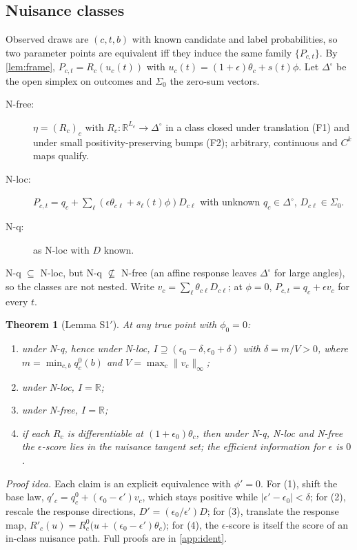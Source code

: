 \documentclass[10pt,twocolumn]{article}
\newtheorem{theorem}{Theorem}
\theoremstyle{definition}
\theoremstyle{remark}
\newcommand{\R}{\mathbb{R}}
\newcommand{\eps}{\epsilon}
\newcommand{\simp}{\Delta^{\circ}}
\begin{document}
\subsection{Nuisance classes}
Observed draws are $(c,t,b)$ with known candidate and label probabilities, so two parameter points are equivalent iff they induce the same family $\{P_{c,t}\}$. By \cref{lem:frame}, $P_{c,t}=R_c(u_c(t))$ with $u_c(t)=(1+\eps)\theta_c+s(t)\phi$. Let $\simp$ be the open simplex on outcomes and $\Sigma_0$ the zero-sum vectors.
\begin{description}
\item[N-free:] $\eta=(R_c)_c$ with $R_c:\R^{L_c}\to\simp$ in a class closed under translation (F1) and under small positivity-preserving bumps (F2); arbitrary, continuous and $C^k$ maps qualify.
\item[N-loc:] $P_{c,t}=q_c+\sum_\ell(\eps\theta_{c\ell}+s_\ell(t)\phi)D_{c\ell}$ with unknown $q_c\in\simp$, $D_{c\ell}\in\Sigma_0$.
\item[N-q:] as N-loc with $D$ known.
\end{description}
N-q $\subseteq$ N-loc, but N-q $\not\subseteq$ N-free (an affine response leaves $\simp$ for large angles), so the classes are not nested. Write $v_c=\sum_\ell\theta_{c\ell}D_{c\ell}$; at $\phi=0$, $P_{c,t}=q_c+\eps v_c$ for every $t$.

\begin{theorem}[Lemma S1$'$]\label{thm:S1}
At any true point with $\phi_0=0$:
\begin{enumerate}[label=(\arabic*)]
\item under N-q, hence under N-loc, $I\supseteq(\eps_0-\delta,\eps_0+\delta)$ with $\delta=m/V>0$, where $m=\min_{c,b}q^0_c(b)$ and $V=\max_c\|v_c\|_\infty$;
\item under N-loc, $I=\R$;
\item under N-free, $I=\R$;
\item if each $R_c$ is differentiable at $(1+\eps_0)\theta_c$, then under N-q, N-loc and N-free the $\eps$-score lies in the nuisance tangent \emph{set}; the efficient information for $\eps$ is $0$.
\end{enumerate}
\end{theorem}
\noindent\emph{Proof idea.} Each claim is an explicit equivalence with $\phi'=0$. For (1), shift the base law, $q'_c=q^0_c+(\eps_0-\eps')v_c$, which stays positive while $|\eps'-\eps_0|<\delta$; for (2), rescale the response directions, $D'=(\eps_0/\eps')D$; for (3), translate the response map, $R'_c(u)=R^0_c\bigl(u+(\eps_0-\eps')\theta_c\bigr)$; for (4), the $\eps$-score is itself the score of an in-class nuisance path. Full proofs are in \cref{app:ident}.
\end{document}
